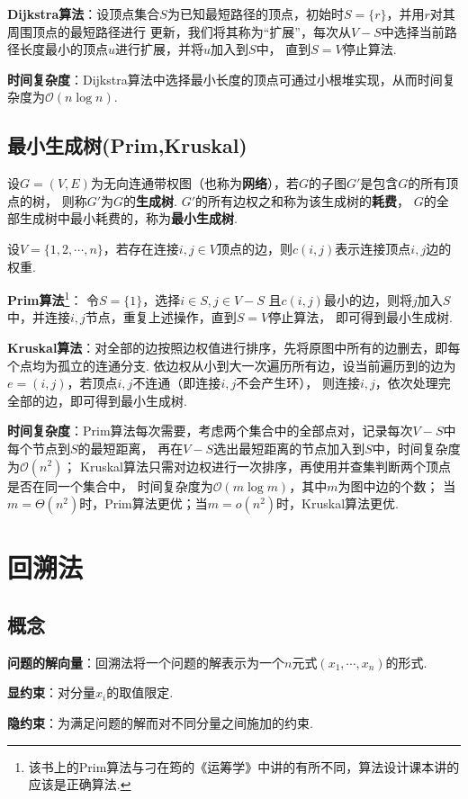 \documentclass[12pt, a4paper, oneside]{ctexart}
\numberwithin{equation}{section}  %
\theoremstyle{definition}
\def\O{\mathcal{O}}         %
\begin{document}
\textbf{Dijkstra算法}：设顶点集合$S$为已知最短路径的顶点，初始时$S = \{r\}$，并用$r$对其周围顶点的最短路径进行
更新，我们将其称为“扩展”，每次从$V-S$中选择当前路径长度最小的顶点$u$进行扩展，并将$u$加入到$S$中，
直到$S=V$停止算法.

\textbf{时间复杂度}：Dijkstra算法中选择最小长度的顶点可通过小根堆实现，从而时间复杂度为$\O(n\log n)$.

\subsection{最小生成树(Prim,Kruskal)}
设$G=(V,E)$为无向连通带权图（也称为\textbf{网络}），若$G$的子图$G'$是包含$G$的所有顶点的树，
则称$G'$为$G$的\textbf{生成树}. $G'$的所有边权之和称为该生成树的\textbf{耗费}，
$G$的全部生成树中最小耗费的，称为\textbf{最小生成树}.

设$V = \{1,2,\cdots, n\}$，若存在连接$i,j\in V$顶点的边，则$c(i,j)$表示连接顶点$i,j$边的权重.

\textbf{Prim算法}\footnote[1]{该书上的Prim算法与刁在筠的《运筹学》中讲的有所不同，算法设计课本讲的应该是正确算法.}：
令$S = \{1\}$，选择$i\in S,j\in V-S$
且$c(i,j)$最小的边，则将$j$加入$S$中，并连接$i,j$节点，重复上述操作，直到$S=V$停止算法，
即可得到最小生成树.

\textbf{Kruskal算法}：对全部的边按照边权值进行排序，先将原图中所有的边删去，即每个点均为孤立的连通分支. 
依边权从小到大一次遍历所有边，设当前遍历到的边为$e=(i,j)$，若顶点$i,j$不连通（即连接$i,j$不会产生环），
则连接$i,j$，依次处理完全部的边，即可得到最小生成树.

\textbf{时间复杂度}：Prim算法每次需要，考虑两个集合中的全部点对，记录每次$V-S$中每个节点到$S$的最短距离，
再在$V-S$选出最短距离的节点加入到$S$中，时间复杂度为$\O(n^2)$；
Kruskal算法只需对边权进行一次排序，再使用并查集判断两个顶点是否在同一个集合中，
时间复杂度为$\O(m\log m)$，其中$m$为图中边的个数；
当$m = \Theta(n^2)$时，Prim算法更优；当$m = o(n^2)$时，Kruskal算法更优.

\section{回溯法}
\subsection{概念}
\textbf{问题的解向量}：回溯法将一个问题的解表示为一个$n$元式$(x_1,\cdots, x_n)$的形式.

\textbf{显约束}：对分量$x_i$的取值限定.

\textbf{隐约束}：为满足问题的解而对不同分量之间施加的约束.
\end{document}
